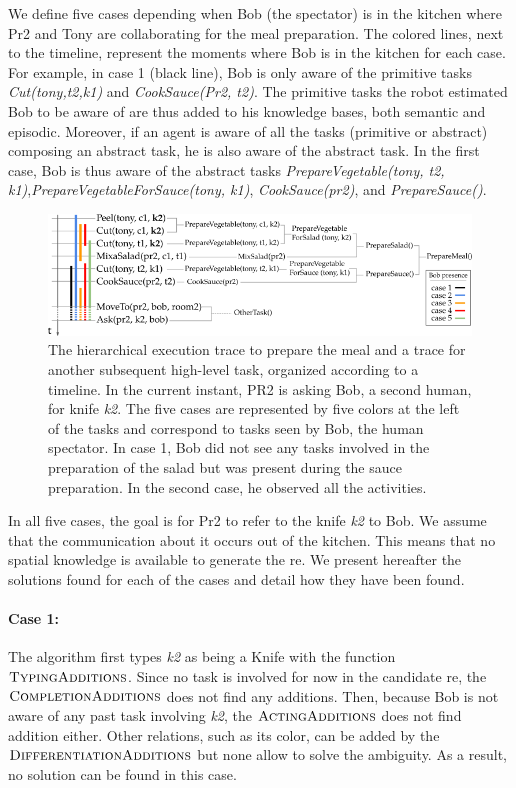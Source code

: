 We define five cases depending when Bob (the spectator) is in the kitchen where Pr2 and Tony are collaborating for the meal preparation. The colored lines, next to the timeline, represent the moments where Bob is in the kitchen for each case. For example, in case 1 (black line), Bob is only aware of the primitive tasks \textit{Cut(tony,t2,k1)} and \textit{CookSauce(Pr2, t2)}. The primitive tasks the robot estimated Bob to be aware of are thus added to his knowledge bases, both semantic and episodic. Moreover, if an agent is aware of all the tasks (primitive or abstract) composing an abstract task, he is also aware of the abstract task. In the first case, Bob is thus aware of the abstract tasks \textit{PrepareVegetable(tony, t2, k1)},\textit{PrepareVegetableForSauce(tony, k1)}, \textit{CookSauce(pr2)}, and \textit{PrepareSauce()}.

\begin{figure}[ht!]
\centering
\includegraphics[width=\textwidth]{figures/chapter6/prepare_meal_plan.png}
\caption{\label{fig:chap6_meal_plan} The hierarchical execution trace to prepare the meal and a trace for another subsequent high-level task, organized according to a timeline. In the current instant, PR2 is asking Bob, a second human, for knife \textit{k2}. The five cases are represented by five colors at the left of the tasks and correspond to tasks seen by Bob, the human spectator. In case 1, Bob did not see any tasks involved in the preparation of the salad but was present during the sauce preparation. In the second case, he observed all the activities.}
\end{figure}

In all five cases, the goal is for Pr2 to refer to the knife \textit{k2} to Bob. We assume that the communication about it occurs out of the kitchen. This means that no spatial knowledge is available to generate the \acrshort{re}. We present hereafter the solutions found for each of the cases and detail how they have been found.

\paragraph{Case 1:} The algorithm first types \textit{k2} as being a Knife with the function $\textsc{TypingAdditions}$.
Since no task is involved for now in the candidate \acrshort{re}, the $\textsc{CompletionAdditions}$ does not find any additions. Then, because Bob is not aware of any past task involving \textit{k2}, the $\textsc{ActingAdditions}$ does not find addition either. Other relations, such as its color, can be added by the $\textsc{DifferentiationAdditions}$ but none allow to solve the ambiguity. As a result, no solution can be found in this case.

